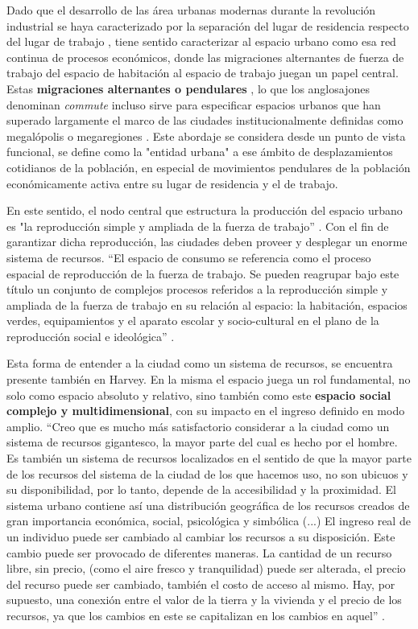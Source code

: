 Dado que el desarrollo de las área urbanas modernas durante la revolución industrial se haya caracterizado por la separación del lugar de residencia respecto del lugar de trabajo \cite{vilagrasa, rodriguez}, tiene sentido caracterizar al espacio urbano como esa red continua de procesos económicos, donde las migraciones alternantes de fuerza de trabajo del espacio de habitación al espacio de trabajo juegan un papel central. Estas \textbf{migraciones alternantes o pendulares} \cite{rodriguez,bertoncello,torres1990}, lo que los anglosajones denominan \textit{commute} incluso sirve para especificar espacios urbanos que han superado largamente el marco de las ciudades institucionalmente definidas como megalópolis o megaregiones \cite{dash}. Este abordaje se considera desde un punto de vista funcional, se define como la "entidad urbana" a ese ámbito de desplazamientos cotidianos de la población, en especial de movimientos pendulares de la población económicamente activa entre su lugar de residencia y el de trabajo.

En este sentido, el nodo central que estructura la producción del espacio urbano es "la reproducción simple y ampliada de la fuerza de trabajo” \cite[~280]{castells}. Con el fin de garantizar dicha reproducción, las ciudades deben proveer y desplegar un enorme sistema de recursos. “El espacio de consumo se referencia como el proceso espacial de reproducción de la fuerza de trabajo. Se pueden reagrupar bajo este título un conjunto de complejos procesos referidos a la reproducción simple y ampliada de la fuerza de trabajo en su relación al espacio: la habitación, espacios verdes, equipamientos y el aparato escolar y socio-cultural en el plano de la reproducción social e ideológica” \cite[~176]{castells}.

Esta forma de entender a la ciudad como un sistema de recursos, se encuentra presente también en Harvey. En la misma el espacio juega un rol fundamental, no solo como espacio absoluto y relativo, sino también como este \textbf{espacio social complejo y multidimensional}, con su impacto en el ingreso definido en modo amplio. “Creo que es mucho más satisfactorio considerar a la ciudad como un sistema de recursos gigantesco, la mayor parte del cual es hecho por el hombre. Es también un sistema de recursos localizados en el sentido de que la mayor parte de los recursos del sistema de la ciudad de los que hacemos uso, no son ubicuos y su disponibilidad, por lo tanto, depende de la accesibilidad y la proximidad. El sistema urbano contiene así una distribución geográfica de los recursos creados de gran importancia económica, social, psicológica y simbólica (...) El ingreso real de un individuo puede ser cambiado al cambiar los recursos a su disposición. Este cambio puede ser provocado de diferentes maneras. La cantidad de un recurso libre, sin precio, (como el aire fresco y tranquilidad) puede ser alterada, el precio del recurso puede ser cambiado, también el costo de acceso al mismo. Hay, por supuesto, una conexión entre el valor de la tierra y la vivienda y el precio de los recursos, ya que los cambios en este se capitalizan en los cambios en aquel” \cite[~68]{harvey}.

